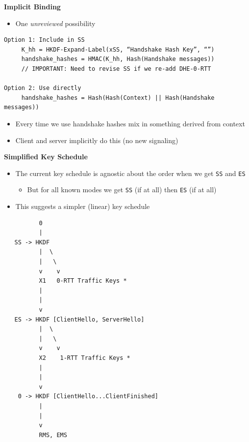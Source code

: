 \documentclass[helvetica]{seminar}
\newcommand{\heading}[1]{%
  \begin{center} 
    \large\bf 
    #1 
  \end{center} 
  \vspace{.4 in}}
\begin{document}
\begin{slide}
\heading{Implicit Binding}

\begin{itemize}
\item One \emph{unreviewed} possibility
\end{itemize}

{\scriptsize
\begin{verbatim}
Option 1: Include in SS
     K_hh = HKDF-Expand-Label(xSS, “Handshake Hash Key”, “”)
     handshake_hashes = HMAC(K_hh, Hash(Handshake messages))
     // IMPORTANT: Need to revise SS if we re-add DHE-0-RTT

Option 2: Use directly
     handshake_hashes = Hash(Hash(Context) || Hash(Handshake messages))
\end{verbatim}
}

\begin{itemize}
\item Every time we use handshake hashes mix in something derived from context
\item Client and server implicitly do this (no new signaling)
\end{itemize}
\end{slide}


\begin{slide}
\begin{minipage}{2in}
\heading{Simplified Key Schedule}

\begin{itemize}
\item The current key schedule is agnostic about the order when we get \verb^SS^ and \verb^ES^
  \begin{itemize}
  \item But for all known modes we get \verb^SS^ (if at all) then \verb^ES^ (if at all)
  \end{itemize}

\item This suggests a simpler (linear) key schedule
\end{itemize}
\end{minipage}
\begin{minipage}{2in}
{\scriptsize
\begin{verbatim}
          0
          |
   SS -> HKDF 
          |  \
          |   \
          v    v
          X1   0-RTT Traffic Keys *
          |
          |
          v
   ES -> HKDF [ClientHello, ServerHello]
          |  \
          |   \
          v    v
          X2    1-RTT Traffic Keys *
          |  
          |
          v    
    0 -> HKDF [ClientHello...ClientFinished]
          |
          |
          v
          RMS, EMS
\end{verbatim}
}
\end{minipage}
\end{slide}
\end{document}

